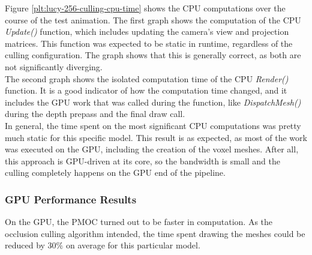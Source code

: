 \noindent
Figure \ref{plt:lucy-256-culling-cpu-time} shows the \ac{CPU} computations over the course of the test animation.
The first graph shows the computation of the \ac{CPU} \emph{Update()} function, which includes updating the camera's 
view and projection matrices. This function was expected to be static in runtime, regardless of the culling configuration. 
The graph shows that this is generally correct, as both are not significantly diverging.\\

\noindent
The second graph shows the isolated computation time of the \ac{CPU} \emph{Render()} function. It is a good indicator of 
how the computation time changed, and it includes the \ac{GPU} work that was called during the function, like 
\emph{DispatchMesh()} during the depth prepass and the final draw call. \\

\noindent
In general, the time spent on the most significant \ac{CPU} computations was pretty much static for this specific 
model. This result is as expected, as most of the work was executed on the \ac{GPU}, including the creation of the 
voxel meshes. After all, this approach is \ac{GPU}-driven at its core, so the bandwidth is small and the culling 
completely happens on the \ac{GPU} end of the pipeline.

\subsubsection*{GPU Performance Results} \label{subsubsec-gpu-performance-results-lucy}

On the \ac{GPU}, the \ac{PMOC} turned out to be faster in computation. As the occlusion 
culling algorithm intended, the time spent drawing the meshes could be reduced by $30\%$ on average for this 
particular model.

